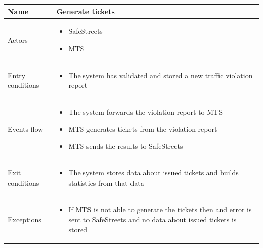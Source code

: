 \documentclass[a4paper]{article}
\begin{document}
\begin{table}[H]
\centering
\begin{tabularx}{\textwidth}{|l|X|}
\hline
Name & Generate tickets\tabularnewline
\hline
Actors &
\begin{itemize}[nosep,leftmargin=*]
\item SafeStreets
\item MTS
\end{itemize}
\tabularnewline
\hline
Entry conditions &
\begin{itemize}[nosep,leftmargin=*]
\item The system has validated and stored a new traffic violation report
\end{itemize}
\tabularnewline
\hline
Events flow &
\begin{itemize}[nosep,leftmargin=*]
\item The system forwards the violation report to MTS
\item MTS generates tickets from the violation report
\item MTS sends the results to SafeStreets
\end{itemize}
\tabularnewline
\hline
Exit conditions &
\begin{itemize}[nosep,leftmargin=*]
\item The system stores data about issued tickets and builds statistics
from that data
\end{itemize}
\tabularnewline
\hline
Exceptions &
\begin{itemize}[nosep,leftmargin=*]
\item If MTS is not able to generate the tickets then and error is sent to
SafeStreets and no data about issued tickets is stored
\end{itemize}
\tabularnewline
\hline
\end{tabularx}
\end{table}
\end{document}
